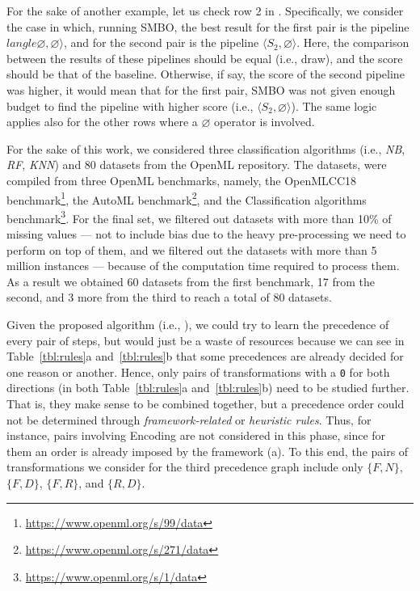 For the sake of another example, let us check row 2 in .
Specifically, we consider the case in which, running SMBO, the best result for the first pair is the pipeline $langle \varnothing, \varnothing \rangle$, and for the second pair is the pipeline $\langle S_2, \varnothing \rangle$.
Here, the comparison between the results of these pipelines should be equal (i.e., draw), and the score should be that of the baseline.
Otherwise, if say, the score of the second pipeline was higher, it would mean that for the first pair, SMBO was not given enough budget to find the pipeline with higher score (i.e., $\langle S_2, \varnothing \rangle$).
The same logic applies also for the other rows where a $\varnothing$ operator is involved.


\begin{example}
For the sake of this work, we considered three classification algorithms (i.e., \textit{NB}, \textit{RF},  \textit{KNN}) and 80 datasets from the OpenML repository. The datasets, were compiled from three OpenML benchmarks, namely, the OpenMLCC18 benchmark\footnote{\url{https://www.openml.org/s/99/data}}, the AutoML benchmark\footnote{\url{https://www.openml.org/s/271/data}}, and the Classification algorithms benchmark\footnote{\url{https://www.openml.org/s/1/data}}.
For the final set, we filtered out datasets with more than 10\% of missing values --- not to include bias due to the heavy pre-processing we need to perform on top of them, and we filtered out the datasets with more than 5 million instances --- because of the computation time required to process them.
As a result we obtained 60 datasets from the first benchmark, 17 from the second, and 3 more from the third to reach a total of 80 datasets.

Given the proposed algorithm (i.e., ), we could try to learn the precedence of every pair of steps, but would just be a waste of resources because we can see in Table~\ref{tbl:rules}a and~\ref{tbl:rules}b that some precedences are already decided for one reason or another.
Hence, only pairs of transformations with a \texttt{0} for both directions (in both Table~\ref{tbl:rules}a and~\ref{tbl:rules}b) need to be studied further.
That is, they make sense to be combined together, but a precedence order could not be determined through \textit{framework-related} or \textit{heuristic rules}. %
Thus, for instance, pairs involving Encoding are not considered in this phase, since for them an order is already imposed by the framework (a).
To this end, the pairs of transformations we consider for the third precedence graph include only $\{F,N\}$, $\{F,D\}$, $\{F,R\}$, and $\{R,D\}$.


\end{example}
